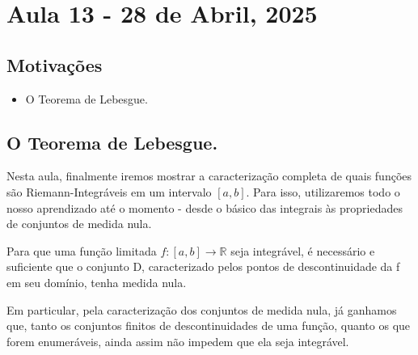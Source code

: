 \documentclass[../analysisII_notes.tex]{subfiles}
\begin{document}
\section{Aula 13 - 28 de Abril, 2025}
\subsection{Motivações}
\begin{itemize}
	\item O Teorema de Lebesgue.
\end{itemize}
\subsection{O Teorema de Lebesgue.}
Nesta aula, finalmente iremos mostrar a caracterização completa de quais funções são Riemann-Integráveis em um intervalo \([a, b]\). Para isso, utilizaremos todo o nosso aprendizado até o momento - desde o básico das integrais às propriedades de conjuntos de medida nula.
\hypertarget{lebesgue_theorem}{\begin{theorem*}
		Para que uma função limitada \(f:[a, b]\rightarrow \mathbb{R}\) seja integrável, é necessário e suficiente que o conjunto D, caracterizado pelos pontos de descontinuidade da f em seu domínio, tenha medida nula.
	\end{theorem*}}
Em particular, pela caracterização dos conjuntos de medida nula, já ganhamos que, tanto os conjuntos finitos de descontinuidades de uma função, quanto os que forem enumeráveis, ainda assim não impedem que ela seja integrável.
\end{document}
